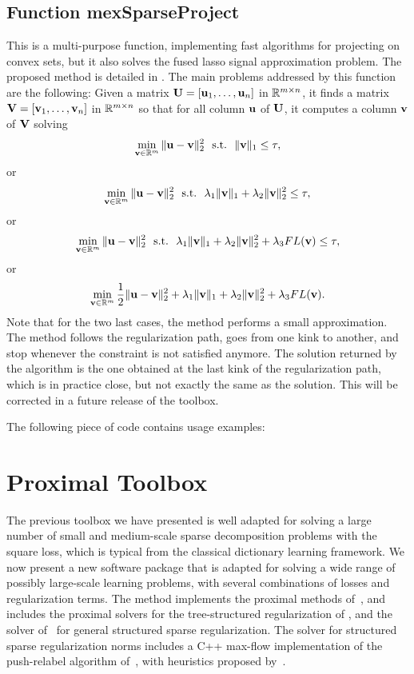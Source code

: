 \documentclass[a4paper, 11pt]{article}
\begin{document}
\subsection{Function mexSparseProject}
This is a multi-purpose function, implementing fast algorithms for projecting
on convex sets, but it also solves the fused lasso signal approximation
problem. The proposed method is detailed in \cite{mairal9}.  The main problems
addressed by this function are the following: Given a matrix
${\mathbf U}=[{\mathbf u}_1,\ldots,{\mathbf u}_n]$ in ${\mathbb R}^{m \times n}$, it finds a matrix
${\mathbf V}=[{\mathbf v}_1,\ldots,{\mathbf v}_n]$ in ${\mathbb R}^{m \times n}$ so that for all column ${\mathbf u}$ of ${\mathbf U}$,
   it computes a column ${\mathbf v}$ of ${\mathbf V}$ solving
   \begin{equation}
   \min_{{\mathbf v} \in {\mathbb R}^m} \|{\mathbf u}-{\mathbf v}\|_2^2  ~~\text{s.t.}~~ \|{\mathbf v}\|_1 \leq \tau,
   \end{equation}
   or
   \begin{equation}
   \min_{{\mathbf v} \in {\mathbb R}^m} \|{\mathbf u}-{\mathbf v}\|_2^2  ~~\text{s.t.}~~ \lambda_1\|{\mathbf v}\|_1 +\lambda_2\|{\mathbf v}\|_2^2\leq \tau,
   \end{equation}
   or
   \begin{equation}
   \min_{{\mathbf v} \in {\mathbb R}^m} \|{\mathbf u}-{\mathbf v}\|_2^2  ~~\text{s.t.}~~ \lambda_1\|{\mathbf v}\|_1 +\lambda_2\|{\mathbf v}\|_2^2+ \lambda_3 FL({\mathbf v}) \leq \tau,
   \end{equation}
   or
   \begin{equation}
   \min_{{\mathbf v} \in {\mathbb R}^m} \frac{1}{2}\|{\mathbf u}-{\mathbf v}\|_2^2 + \lambda_1\|{\mathbf v}\|_1 +\lambda_2\|{\mathbf v}\|_2^2+ \lambda_3 FL({\mathbf v}).
   \end{equation}
   Note that for the two last cases, the method performs a small approximation.
   The method follows the regularization path, goes from one kink to another, and 
   stop whenever the constraint is not satisfied anymore. The solution returned 
   by the algorithm is the one obtained at the last kink of the regularization path,
   which is in practice close, but not exactly the same as the solution.
   This will be corrected in a future release of the toolbox.

%    

The following piece of code contains usage examples:


\section{Proximal Toolbox}
The previous toolbox we have presented is well
adapted for solving a large number of small and medium-scale sparse
decomposition problems with the square loss, which is typical from the
classical dictionary learning framework. We now present
a new software package that is adapted for solving a wide range of
possibly large-scale learning problems, with several combinations of losses and
regularization terms. The method implements the proximal methods
of~\cite{beck}, and includes the proximal solvers for the tree-structured
regularization of \cite{jenatton3}, and the solver of~\cite{mairal10} for
general structured sparse regularization.
The solver for structured sparse regularization norms includes a C++ max-flow
implementation of the push-relabel algorithm of~\cite{goldberg}, with
heuristics proposed by~\cite{cherkassky}.
\end{document}
